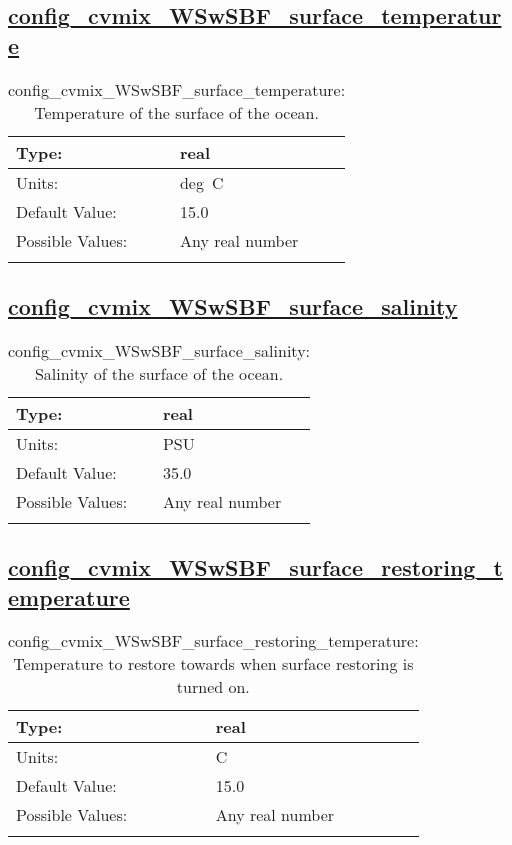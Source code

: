 \subsection[config\_cvmix\_WSwSBF\_surface\_temperature]{\hyperref[sec:nm_tab_cvmix_WSwSBF]{config\_cvmix\_WSwSBF\_surface\_temperature}}
\label{subsec:nm_sec_config_cvmix_WSwSBF_surface_temperature}
\begin{center}
\begin{longtable}{| p{2.0in} || p{4.0in} |}
    \hline
    Type: & real \\
    \hline
    Units: & \si{deg.C} \\
    \hline
    Default Value: & 15.0 \\
    \hline
    Possible Values: & Any real number \\
    \hline
    \caption{config\_cvmix\_WSwSBF\_surface\_temperature: Temperature of the surface of the ocean.}
\end{longtable}
\end{center}
\subsection[config\_cvmix\_WSwSBF\_surface\_salinity]{\hyperref[sec:nm_tab_cvmix_WSwSBF]{config\_cvmix\_WSwSBF\_surface\_salinity}}
\label{subsec:nm_sec_config_cvmix_WSwSBF_surface_salinity}
\begin{center}
\begin{longtable}{| p{2.0in} || p{4.0in} |}
    \hline
    Type: & real \\
    \hline
    Units: & \si{PSU} \\
    \hline
    Default Value: & 35.0 \\
    \hline
    Possible Values: & Any real number \\
    \hline
    \caption{config\_cvmix\_WSwSBF\_surface\_salinity: Salinity of the surface of the ocean.}
\end{longtable}
\end{center}
\subsection[config\_cvmix\_WSwSBF\_surface\_restoring\_temperature]{\hyperref[sec:nm_tab_cvmix_WSwSBF]{config\_cvmix\_WSwSBF\_surface\_restoring\_temperature}}
\label{subsec:nm_sec_config_cvmix_WSwSBF_surface_restoring_temperature}
\begin{center}
\begin{longtable}{| p{2.0in} || p{4.0in} |}
    \hline
    Type: & real \\
    \hline
    Units: & \si{C} \\
    \hline
    Default Value: & 15.0 \\
    \hline
    Possible Values: & Any real number \\
    \hline
    \caption{config\_cvmix\_WSwSBF\_surface\_restoring\_temperature: Temperature to restore towards when surface restoring is turned on.}
\end{longtable}
\end{center}
